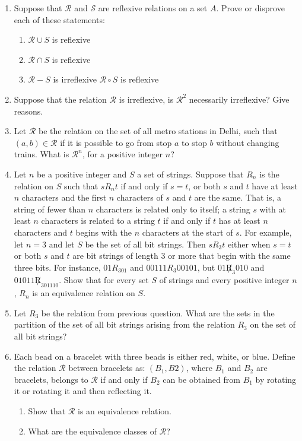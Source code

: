 \documentclass[a4paper]{article}
\begin{document}
\begin{enumerate}
\item Suppose that $\mathcal{R}$ and $\mathcal{S}$ are reflexive relations on a set $A$. Prove or disprove each of these statements:
\begin{enumerate}
\item $\mathcal{R} \cup S$ is reflexive
\item $\mathcal{R} \cap S$ is reflexive
\item $\mathcal{R} - S$ is irreflexive
$\mathcal{R} \circ S$ is reflexive
\end{enumerate}

\item Suppose that the relation $\mathcal{R}$ is irreflexive, is $\mathcal{R}^2$ necessarily irreflexive? Give reasons.

\item Let $\mathcal{R}$ be the relation on the set of all metro stations in Delhi, such that $(a,b) \in \mathcal{R}$ if it is possible to go from stop $a$ to stop $b$ without changing trains. What is $\mathcal{R}^n$, for a positive integer $n$?

\item Let $n$ be a positive integer and $S$ a set of strings. Suppose that 
$R_n$ is the relation on $S$ such
that $sR_nt$ if and only if $s = t$, or both $s$ and $t$ have at least $n$ characters and the first $n$ characters
of $s$ and $t$ are the same. That is, a string of fewer than $n$ characters is related only to itself; a string $s$ with at least $n$ characters is related to a string $t$ if and only if $t$ has at least $n$ characters
and $t$ begins with the $n$ characters at the start of $s$. For example, let $n = 3$ and let $S$ be the set
of all bit strings. Then $sR_3t$ either when $s = t$ or both $s$ and $t$ are bit strings of length 3 or more
that begin with the same three bits. For instance, $01R_301$ and $00111R_3 00101$, but $01\not R_3 010$
and $01011\not  R_301110$.
Show that for every set $S$ of strings and every positive integer $n$, $R_n$ is an equivalence
relation on $S$.



\item Let $R_3$ be the relation from previous question. What are the sets in the partition of the set of all bit strings
arising from the relation $R_3$ on the set of all bit strings? 


\item Each bead on a bracelet with three beads is either red,
white, or blue. Define the relation $\mathcal{R}$ between bracelets as: $(B_1,B2)$,
where $B_1$ and $B_2$ are bracelets, belongs to $\mathcal{R}$ if and only
if $B_2$ can be obtained from $B_1$ by rotating it or rotating it
and then reflecting it.
\begin{enumerate}
\item Show that $\mathcal{R}$ is an equivalence relation.
\item What are the equivalence classes of $\mathcal{R}$?
\end{enumerate}


\end{enumerate}
\end{document}

